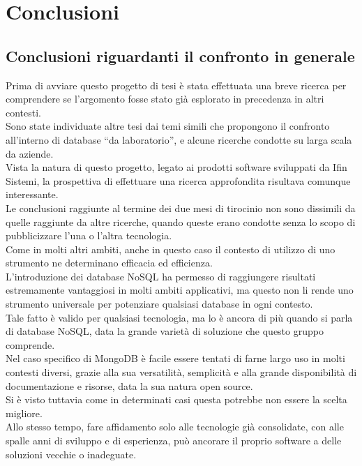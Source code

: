 
\chapter{Conclusioni}
\label{cap:conclusioni}
\section{Conclusioni riguardanti il confronto in generale}
Prima di avviare questo progetto di tesi è stata effettuata una breve ricerca per comprendere se l'argomento fosse stato già esplorato in precedenza in altri contesti.\\
Sono state individuate altre tesi dai temi simili che propongono il confronto all'interno di database ``da laboratorio'', e alcune ricerche condotte su larga scala da aziende.\\
Vista la natura di questo progetto, legato ai prodotti software sviluppati da Ifin Sistemi, la prospettiva di effettuare una ricerca approfondita risultava comunque interessante.\\

\noindent Le conclusioni raggiunte al termine dei due mesi di tirocinio non sono dissimili da quelle raggiunte da altre ricerche, quando queste erano condotte senza lo scopo di pubblicizzare l'una o l'altra tecnologia.\\
Come in molti altri ambiti, anche in questo caso il contesto di utilizzo di uno strumento ne determinano efficacia ed efficienza.\\
L'introduzione dei database NoSQL ha permesso di raggiungere risultati estremamente vantaggiosi in molti ambiti applicativi, ma questo non li rende uno strumento universale per potenziare qualsiasi database in ogni contesto.\\
Tale fatto è valido per qualsiasi tecnologia, ma lo è ancora di più quando si parla di database NoSQL, data la grande varietà di soluzione che questo gruppo comprende.\\
Nel caso specifico di MongoDB è facile essere tentati di farne largo uso in molti contesti diversi, grazie alla sua versatilità, semplicità e alla grande disponibilità di documentazione e risorse, data la sua natura open source.\\
Si è visto tuttavia come in determinati casi questa potrebbe non essere la scelta migliore.\\
Allo stesso tempo, fare affidamento solo alle tecnologie già consolidate, con alle spalle anni di sviluppo e di esperienza, può ancorare il proprio software a delle soluzioni vecchie o inadeguate.\\

